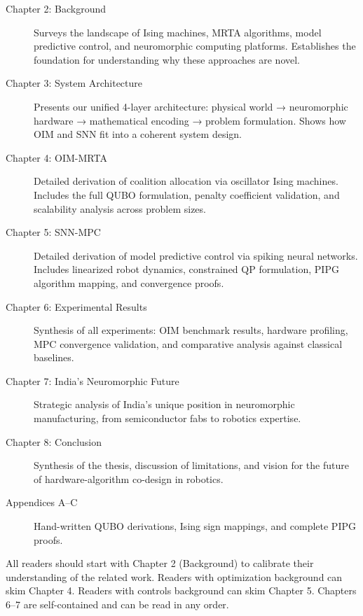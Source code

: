 \begin{description}
\item[Chapter 2: Background] Surveys the landscape of Ising machines, MRTA algorithms, model predictive control, and neuromorphic computing platforms. Establishes the foundation for understanding why these approaches are novel.

\item[Chapter 3: System Architecture] Presents our unified 4-layer architecture: physical world → neuromorphic hardware → mathematical encoding → problem formulation. Shows how OIM and SNN fit into a coherent system design.

\item[Chapter 4: OIM-MRTA] Detailed derivation of coalition allocation via oscillator Ising machines. Includes the full QUBO formulation, penalty coefficient validation, and scalability analysis across problem sizes.

\item[Chapter 5: SNN-MPC] Detailed derivation of model predictive control via spiking neural networks. Includes linearized robot dynamics, constrained QP formulation, PIPG algorithm mapping, and convergence proofs.

\item[Chapter 6: Experimental Results] Synthesis of all experiments: OIM benchmark results, hardware profiling, MPC convergence validation, and comparative analysis against classical baselines.

\item[Chapter 7: India's Neuromorphic Future] Strategic analysis of India's unique position in neuromorphic manufacturing, from semiconductor fabs to robotics expertise.

\item[Chapter 8: Conclusion] Synthesis of the thesis, discussion of limitations, and vision for the future of hardware-algorithm co-design in robotics.

\item[Appendices A--C] Hand-written QUBO derivations, Ising sign mappings, and complete PIPG proofs.
\end{description}

All readers should start with Chapter 2 (Background) to calibrate their understanding of the related work. Readers with optimization background can skim Chapter 4. Readers with controls background can skim Chapter 5. Chapters 6--7 are self-contained and can be read in any order.

